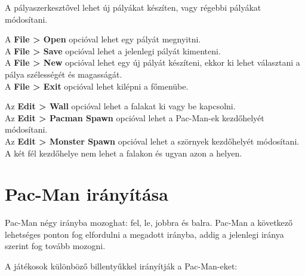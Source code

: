 \documentclass{article}
\begin{document}
A pályaszerkesztővel lehet új pályákat készíten, vagy régebbi pályákat
módosítani.

A \textbf{File > Open} opcióval lehet egy pályát megnyitni.\\
A \textbf{File > Save} opcióval lehet a jelenlegi pályát kimenteni.\\
A \textbf{File > New} opcióval lehet egy új pályát készíteni, ekkor ki lehet választani
a pálya szélességét és magasságát.\\
A \textbf{File > Exit} opcióval lehet kilépni a főmenübe.

Az \textbf{Edit > Wall} opcióval lehet a falakat ki vagy be kapcsolni.\\
Az \textbf{Edit > Pacman Spawn} opcióval lehet a Pac-Man-ek kezdőhelyét módosítani.\\
Az \textbf{Edit > Monster Spawn} opcióval lehet a szörnyek kezdőhelyét módosítani.\\
A két fél kezdőhelye nem lehet a falakon és ugyan azon a helyen.

\newpage
\appendix

\section{Pac-Man irányítása}\label{appendix:controls}

Pac-Man négy irányba mozoghat: fel, le, jobbra és balra. Pac-Man a következő
lehetséges ponton fog elfordulni a megadott irányba, addig a jelenlegi
iránya szerint fog tovább mozogni.

A játékosok különböző billentyűkkel irányítják a Pac-Man-eket:

\end{document}
